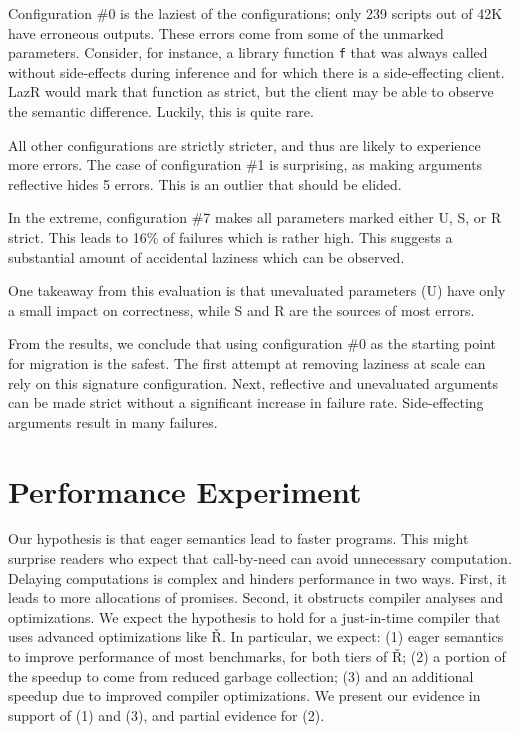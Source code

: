 \documentclass[review,creen,acmsmall]{acmart}
\renewcommand{\c}[1]{\lstinline |#1|\xspace}
\newcommand{\lazr}{{\sf LazR}\xspace}
\renewcommand{\Rsh}{{\sf\v R}\xspace}
\newcommand{\config}[1]{configuration \#{#1}}
\newcommand{\cconfig}[1]{Configuration \#{#1}}
\begin{document}
\cconfig 0 is the laziest of the configurations; only 239 scripts out of 42K
have erroneous outputs. These errors come from some of the
unmarked parameters. Consider, for instance, a library function \c f that was
always called without side-effects during inference and for which there is a
side-effecting client. \lazr would mark that function as strict, but the client
may be able to observe the semantic difference. Luckily, this is quite rare.

All other configurations are strictly stricter, and thus are likely to experience
more errors. The case of \config 1 is surprising, as making arguments reflective
hides 5 errors. This is an outlier that should be elided.

In the extreme, \config 7 makes all parameters marked either U, S, or R strict.
This leads to 16\% of failures which is rather high. This suggests a substantial
amount of accidental laziness which can be observed.

One takeaway from this evaluation is that unevaluated parameters (U) have only a
small impact on correctness, while S and R are the sources of most errors.

From the results, we conclude that using \config 0 as the starting point for
migration is the safest. The first attempt at removing laziness at scale can rely on
this signature configuration. Next, reflective and unevaluated arguments can be
made strict without a significant increase in failure rate. Side-effecting
arguments result in many failures.


\section{Performance Experiment}\label{sec:rsh}

Our hypothesis is that eager semantics lead to faster programs. This might
surprise readers who expect that call-by-need can avoid unnecessary
computation. Delaying computations is complex and hinders performance in two
ways. First, it leads to more allocations of promises. Second, it obstructs
compiler analyses and optimizations. We expect the hypothesis to hold for a
just-in-time compiler that uses advanced optimizations like \Rsh. In particular,
we expect: (1) eager semantics to improve performance of most benchmarks, for
both tiers of \Rsh; (2) a portion of the speedup to come from reduced garbage
collection; (3) and an additional speedup due to improved compiler
optimizations. We present our evidence in support of (1) and (3), and partial
evidence for (2).
\end{document}
